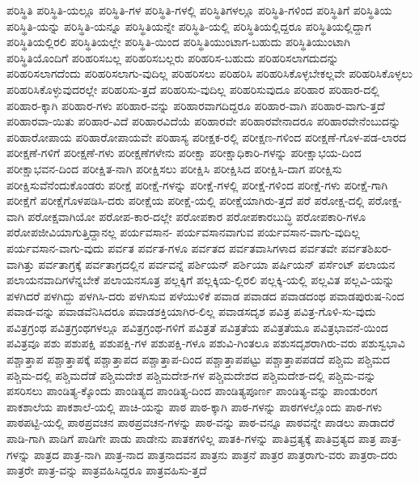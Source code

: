 {ಪರಿಸ್ಥಿತಿ
ಪರಿಸ್ಥಿತಿ-ಯಲ್ಲೂ
ಪರಿಸ್ಥಿತಿ-ಗಳ
ಪರಿಸ್ಥಿತಿ-ಗಳಲ್ಲಿ
ಪರಿಸ್ಥಿತಿಗಳಲ್ಲೂ
ಪರಿಸ್ಥಿತಿ-ಗಳಿಂದ
ಪರಿಸ್ಥಿತಿಗೆ
ಪರಿಸ್ಥಿತಿಯ
ಪರಿಸ್ಥಿತಿ-ಯನ್ನು
ಪರಿಸ್ಥಿತಿ-ಯನ್ನೂ
ಪರಿಸ್ಥಿತಿಯನ್ನೇ
ಪರಿಸ್ಥಿತಿ-ಯಲ್ಲಿ
ಪರಿಸ್ಥಿತಿಯಲ್ಲಿದ್ದರೂ
ಪರಿಸ್ಥಿತಿಯಲ್ಲಿದ್ದಾಗ
ಪರಿಸ್ಥಿತಿಯಲ್ಲಿರಲಿ
ಪರಿಸ್ಥಿತಿಯಲ್ಲೇ
ಪರಿಸ್ಥಿತಿ-ಯಿಂದ
ಪರಿಸ್ಥಿತಿಯುಂಟಾಗ-ಬಹುದು
ಪರಿಸ್ಥಿತಿಯುಂಟಾಗಿ
ಪರಿಸ್ಥಿತಿಯೊಂದಿಗೆ
ಪರಿಹರಿಸಬಲ್ಲ
ಪರಿಹರಿಸಬಲ್ಲರು
ಪರಿಹರಿಸ-ಬಹುದು
ಪರಿಹರಿಸಲಾಗದುದನ್ನು
ಪರಿಹರಿಸಲಾಗದೆಂದು
ಪರಿಹರಿಸಲಾಗು-ವುದಿಲ್ಲ
ಪರಿಹರಿಸಲು
ಪರಿಹರಿಸಿ
ಪರಿಹರಿಸಿಕೊಳ್ಳಬೇಕಲ್ಲವೇ
ಪರಿಹರಿಸಿಕೊಳ್ಳಲು
ಪರಿಹರಿಸಿಕೊಳ್ಳುವುದರಲ್ಲೇ
ಪರಿಹರಿಸು-ತ್ತದೆ
ಪರಿಹರಿಸು-ವುದಿಲ್ಲ
ಪರಿಹರಿಸುವುದೂ
ಪರಿಹಾರ
ಪರಿಹಾರ-ದಲ್ಲಿ
ಪರಿಹಾರ-ಕ್ಕಾಗಿ
ಪರಿಹಾರ-ಗಳು
ಪರಿಹಾರ-ವನ್ನು
ಪರಿಹಾರವಾಗದಿದ್ದರೂ
ಪರಿಹಾರ-ವಾಗಿ
ಪರಿಹಾರ-ವಾಗು-ತ್ತದೆ
ಪರಿಹಾರವಾ-ಯಿತು
ಪರಿಹಾರ-ವಿದೆ
ಪರಿಹಾರವಿದೆಯೆ
ಪರಿಹಾರವೇ
ಪರಿಹಾರವೇನಾದರೂ
ಪರಿಹಾರವೇನೆಂಬುದನ್ನು
ಪರಿಹಾರೋಪಾಯ
ಪರಿಹಾರೋಪಾಯವೇ
ಪರಿಹಾಸ್ಯ
ಪರೀಕ್ಷಕ-ರಲ್ಲಿ
ಪರೀಕ್ಷಣ-ಗಳಿಂದ
ಪರೀಕ್ಷಣೆ-ಗೊಳ-ಪಡ-ಲಾರದ
ಪರೀಕ್ಷಣೆ-ಗಳಿಗೆ
ಪರೀಕ್ಷಣೆ-ಗಳು
ಪರೀಕ್ಷಣೆಗಳೇನು
ಪರೀಕ್ಷಾ
ಪರೀಕ್ಷಾಧಿಕಾರಿ-ಗಳನ್ನು
ಪರೀಕ್ಷಾಭಯ-ದಿಂದ
ಪರೀಕ್ಷಾಭವನ-ದಿಂದ
ಪರೀಕ್ಷಿತ-ನಾಗಿ
ಪರೀಕ್ಷಿಸಲು
ಪರೀಕ್ಷಿಸಿ
ಪರೀಕ್ಷಿಸಿದ
ಪರೀಕ್ಷಿಸಿ-ದಾಗ
ಪರೀಕ್ಷಿಸು
ಪರೀಕ್ಷಿಸುವೆನೆಂದುಕೊಂಡರು
ಪರೀಕ್ಷೆ
ಪರೀಕ್ಷೆ-ಗಳನ್ನು
ಪರೀಕ್ಷೆ-ಗಳಲ್ಲಿ
ಪರೀಕ್ಷೆ-ಗಳಿಂದ
ಪರೀಕ್ಷೆ-ಗಳು
ಪರೀಕ್ಷೆ-ಗಾಗಿ
ಪರೀಕ್ಷೆಗೆ
ಪರೀಕ್ಷೆಗೊಳಪಡಿಸಿ-ದರು
ಪರೀಕ್ಷೆಯ
ಪರೀಕ್ಷೆ-ಯಲ್ಲಿ
ಪರೀಕ್ಷೆಯಾಗಿರು-ತ್ತದೆ
ಪರೆ
ಪರೋಕ್ಷ-ದಲ್ಲಿ
ಪರೋಕ್ಷ-ವಾಗಿ
ಪರೋಕ್ಷವಾಗಿಯೋ
ಪರೋಪ-ಕಾರ-ದಲ್ಲೇ
ಪರೋಪಕಾರ
ಪರೋಪಕಾರಬುದ್ಧಿ
ಪರೋಪಕಾರಿ-ಗಳೂ
ಪರೋಪಜೀವಿಯಾಗುತ್ತಿದ್ದಾನಲ್ಲ
ಪರ್ಯವಸಾನ-
ಪರ್ಯವಸಾನವಾಗುವ
ಪರ್ಯವಸಾನ-ವಾಗು-ವುದಿಲ್ಲ
ಪರ್ಯವಸಾನ-ವಾಗು-ವುದು
ಪರ್ವತ
ಪರ್ವತ-ಗಳೂ
ಪರ್ವತದ
ಪರ್ವತವಾಸಿಗಳಾದ
ಪರ್ವತವೇ
ಪರ್ವತಶಿಖರ-ವಾಗಿತ್ತು
ಪರ್ವತಾಗ್ರಕ್ಕೆ
ಪರ್ವತಾಗ್ರದಲ್ಲಿನ
ಪರ್ವವನ್ನೆ
ಪರ್ಶಿಯನ್
ಪರ್ಶಿಯಾ
ಪರ್ಷಿಯನ್
ಪರ್ಸೆಂಟ್
ಪಲಾಯನ
ಪಲಾಯನವಾದಿಗಳೆನ್ನಬೇಕೆ
ಪಲಾಯನಸೂತ್ರ
ಪಲ್ಲಕ್ಕಿಗೆ
ಪಲ್ಲಕ್ಕಿಯ-ಲ್ಲಿರಲಿ
ಪಲ್ಲಕ್ಕಿ-ಯಲ್ಲಿ
ಪಲ್ಲವಿತ
ಪಲ್ಲವಿ-ಯನ್ನು
ಪಳಗಿದರೆ
ಪಳಗಿದ್ದು
ಪಳಗಿಸಿ-ದರು
ಪಳಗಿಸುವ
ಪಳೆಯುಳಿಕೆ
ಪವಾಡ
ಪವಾಡದ
ಪವಾಡದಂಥ
ಪವಾಡಪುರುಷ-ನಿಂದ
ಪವಾಡ-ವನ್ನು
ಪವಾಡವೆನಿಸಿದರೂ
ಪವಾಡಶಕ್ತಿಯಾಗಿರ-ಲಿಲ್ಲ
ಪವಾಡಸದೃಶ
ಪವಿತ್ರ
ಪವಿತ್ರ-ಗೊಳಿ-ಸು-ವುದು
ಪವಿತ್ರಗ್ರಂಥ
ಪವಿತ್ರಗ್ರಂಥಗಳಲ್ಲೂ
ಪವಿತ್ರಗ್ರಂಥ-ಗಳಿಗೆ
ಪವಿತ್ರತೆ
ಪವಿತ್ರತೆಯ
ಪವಿತ್ರತೆಯೂ
ಪವಿತ್ರಭಾವನೆ-ಯಿಂದ
ಪವಿತ್ರವೂ
ಪಶು
ಪಶುಪಕ್ಷಿ
ಪಶುಪಕ್ಷಿ-ಗಳ
ಪಶುಪಕ್ಷಿ-ಗಳೂ
ಪಶುವಿ-ಗಿಂತಲೂ
ಪಶುಸದೃಶರಾಗಿರು-ವರು
ಪಶುಸ್ವಭಾವಿ
ಪಶ್ಚಾತ್ತಾಪ
ಪಶ್ಚಾತ್ತಾಪಕ್ಕೆ
ಪಶ್ಚಾತ್ತಾಪದ
ಪಶ್ಚಾತ್ತಾಪ-ದಿಂದ
ಪಶ್ಚಾತ್ತಾಪಪಟ್ಟು
ಪಶ್ಚಾತ್ತಾಪಪಡದೆ
ಪಶ್ಚಿಮ
ಪಶ್ಚಿಮದ
ಪಶ್ಚಿಮ-ದಲ್ಲಿ
ಪಶ್ಚಿಮದೆಡೆ
ಪಶ್ಚಿಮದೇಶ
ಪಶ್ಚಿಮದೇಶ-ಗಳ
ಪಶ್ಚಿಮದೇಶದ
ಪಶ್ಚಿಮದೇಶ-ದಲ್ಲಿ
ಪಶ್ಚಿಮ-ವನ್ನು
ಪಸರಿಸಲು
ಪಾಂಡಿತ್ಯ-ಕ್ಕೊಂದು
ಪಾಂಡಿತ್ಯದ
ಪಾಂಡಿತ್ಯ-ದಿಂದ
ಪಾಂಡಿತ್ಯಪೂರ್ಣ
ಪಾಂಡಿತ್ಯ-ವನ್ನು
ಪಾಂಡುರಂಗ
ಪಾಕಶಾಲೆಯ
ಪಾಕಶಾಲೆ-ಯಲ್ಲಿ
ಪಾಚಿ-ಯನ್ನು
ಪಾಠ
ಪಾಠ-ಕ್ಕಾಗಿ
ಪಾಠ-ಗಳನ್ನು
ಪಾಠಗಳಲ್ಲೊಂದು
ಪಾಠ-ಗಳು
ಪಾಠಪಟ್ಟಿ-ಯಲ್ಲಿ
ಪಾಠಪ್ರವಚನ
ಪಾಠಪ್ರವಚನ-ಗಳನ್ನು
ಪಾಠ-ವನ್ನು
ಪಾಠ-ವನ್ನೂ
ಪಾಠವನ್ನೇ
ಪಾಡಲು
ಪಾಡಾದರೆ
ಪಾಡಿ-ಗಾಗಿ
ಪಾಡಿಗೆ
ಪಾಡಿಗೇ
ಪಾಡು
ಪಾಡೇನು
ಪಾತಕಗಳಿಲ್ಲ
ಪಾತಕಿ-ಗಳನ್ನು
ಪಾತಿವ್ರತ್ಯಕ್ಕೆ
ಪಾತಿವ್ರತ್ಯದ
ಪಾತ್ರ
ಪಾತ್ರ-ಗಳನ್ನು
ಪಾತ್ರದ
ಪಾತ್ರ-ನಾಗಿ
ಪಾತ್ರ-ನಾದ
ಪಾತ್ರನಾದವನ
ಪಾತ್ರನು
ಪಾತ್ರನೆ
ಪಾತ್ರರ
ಪಾತ್ರರಾಗು-ವರು
ಪಾತ್ರರಾ-ದರು
ಪಾತ್ರರೇ
ಪಾತ್ರ-ವನ್ನು
ಪಾತ್ರವಹಿಸಿದ್ದರೂ
ಪಾತ್ರವಹಿಸು-ತ್ತದೆ
}
